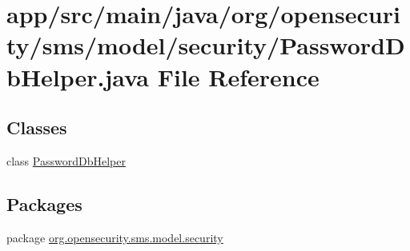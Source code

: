 \hypertarget{a00024}{\section{app/src/main/java/org/opensecurity/sms/model/security/\+Password\+Db\+Helper.java File Reference}
\label{a00024}
}
\subsection*{Classes}
\begin{DoxyCompactItemize}
\item 
class \hyperlink{a00011}{Password\+Db\+Helper}
\end{DoxyCompactItemize}
\subsection*{Packages}
\begin{DoxyCompactItemize}
\item 
package \hyperlink{a00039}{org.\+opensecurity.\+sms.\+model.\+security}
\end{DoxyCompactItemize}
